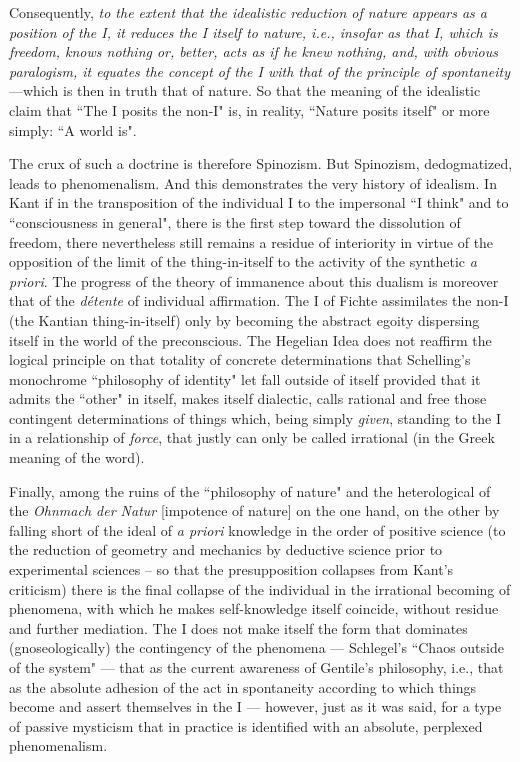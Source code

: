 Consequently, \emph{to the extent that the idealistic reduction of nature appears as a position of the I, it reduces the I itself to nature, i.e., insofar as that I, which is freedom, knows nothing or, better, acts as if he knew nothing, and, with obvious paralogism, it equates the concept of the I with that of the }\emph{principle of spontaneity}—which is then in truth that of nature. So that the meaning of the idealistic claim that ``The I posits the non-I" is, in reality, ``Nature posits itself" or more simply: ``A world is".

The crux of such a doctrine is therefore Spinozism. But Spinozism, dedogmatized, leads to phenomenalism. And this demonstrates the very history of idealism. In Kant if in the transposition of the individual I to the impersonal ``I think" and to ``consciousness in general", there is the first step toward the dissolution of freedom, there nevertheless still remains a residue of interiority in virtue of the opposition of the limit of the thing-in-itself to the activity of the synthetic \emph{a priori}. The progress of the theory of immanence about this dualism is moreover that of the \emph{détente} of individual affirmation. The I of Fichte assimilates the non-I (the Kantian thing-in-itself) only by becoming the abstract egoity dispersing itself in the world of the preconscious. The Hegelian Idea does not reaffirm the logical principle on that totality of concrete determinations that Schelling's monochrome ``philosophy of identity" let fall outside of itself provided that it admits the ``other" in itself, makes itself dialectic, calls rational and free those contingent determinations of things which, being simply \emph{given}, standing to the I in a relationship of \emph{force}, that justly can only be called irrational (in the Greek meaning of the word).

Finally, among the ruins of the ``philosophy of nature" and the heterological of the \emph{Ohnmach der Natur} [impotence of nature] on the one hand, on the other by falling short of the ideal of \emph{a priori} knowledge in the order of positive science (to the reduction of geometry and mechanics by deductive science prior to experimental sciences – so that the presupposition collapses from Kant's criticism) there is the final collapse of the individual in the irrational becoming of phenomena, with which he makes self-knowledge itself coincide, without residue and further mediation. The I does not make itself the form that dominates (gnoseologically) the contingency of the phenomena — Schlegel's ``Chaos outside of the system" — that as the current awareness of Gentile's philosophy, i.e., that as the absolute adhesion of the act in spontaneity according to which things become and assert themselves in the I — however, just as it was said, for a type of passive mysticism that in practice is identified with an absolute, perplexed phenomenalism.


